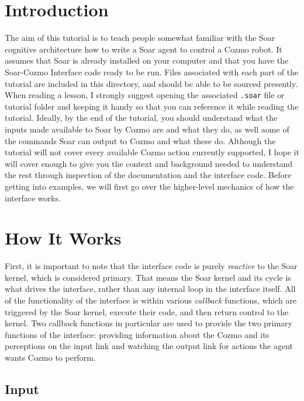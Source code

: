 \hypertarget{introduction}{%
\section{Introduction}\label{introduction}}

The aim of this tutorial is to teach people somewhat familiar with the
Soar cognitive architecture how to write a Soar agent to control a Cozmo
robot. It assumes that Soar is already installed on your computer and
that you have the Soar-Cozmo Interface code ready to be run. Files
associated with each part of the tutorial are included in this
directory, and should be able to be sourced presently. When reading a
lesson, I strongly suggest opening the associated \texttt{.soar} file or
tutorial folder and keeping it handy so that you can reference it while
reading the tutorial. Ideally, by the end of the tutorial, you should
understand what the inputs made available to Soar by Cozmo are and what
they do, as well aome of the commands Soar can output to Cozmo and what
these do. Although the tutorial will not cover every available Cozmo
action currently supported, I hope it will cover enough to give you the
context and background needed to understand the rest through inspection
of the documentation and the interface code. Before getting into
examples, we will first go over the higher-level mechanics of how the
interface works.

\hypertarget{how-it-works}{%
\section{How It Works}\label{how-it-works}}

First, it is important to note that the interface code is purely
\emph{reactive} to the Soar kernel, which is considered primary. That
means the Soar kernel and its cycle is what drives the interface, rather
than any internal loop in the interface itself. All of the functionality
of the interface is within various \emph{callback} functions, which are
triggered by the Soar kernel, execute their code, and then return
control to the kernel. Two callback functions in particular are used to
provide the two primary functions of the interface: providing
information about the Cozmo and its perceptions on the input link and
watching the output link for actions the agent wants Cozmo to perform.

\hypertarget{input}{%
\subsection{Input}\label{input}}

